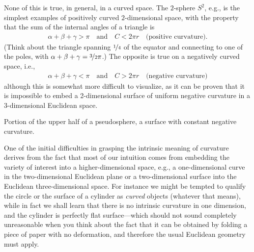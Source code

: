 None of this is true, in general, in a curved space. The $2$-sphere $S^2$, e.g.,
is the simplest examples of positively curved $2$-dimensional space, with the property
that the sum of the internal angles of a triangle is
\begin{align*}
  \alpha + \beta + \gamma > \pi \quad\text{and}\quad C < 2\pi r
  \quad\text{(positive curvature)}.
\end{align*}
(Think about the triangle spanning $\nicefrac{1}{4}$ of the equator and connecting
to one of the poles, with $\alpha + \beta + \gamma =  \nicefrac{3}{2} \pi$.)
The opposite is true on a negatively curved space, i.e.,
\begin{align*}
  \alpha + \beta + \gamma < \pi \quad\text{and}\quad C > 2\pi r
  \quad\text{(negative curvature)}
\end{align*}
although this is somewhat more difficult to visualize, as it can be proven that it
is impossible to embed a 2-dimensional surface of uniform negative curvature in a
3-dimensional Euclidean space.

\begin{marginfigure}
  \begin{center}
  \end{center}
  \caption{Portion of the upper half of a pseudosphere, a surface with constant
  negative curvature.}
\end{marginfigure}

One of the initial difficulties in grasping the intrinsic meaning of curvature derives
from the fact that most of our intuition comes from embedding the variety of
interest into a higher-dimensional space, e.g., a one-dimensional curve in the
two-dimensional Euclidean plane or a two-dimensional surface into the Euclidean
three-dimensional space. For instance we might be tempted to qualify the circle
or the surface of a cylinder as \emph{curved} objects (whatever that means), while
in fact we shall learn that there is no intrinsic curvature in one
dimension, and the cylinder is perfectly flat surface---which should
not sound completely unreasonable when you think about the fact that it can be obtained
by folding a piece of paper with no deformation, and therefore the usual Euclidean
geometry must apply.


